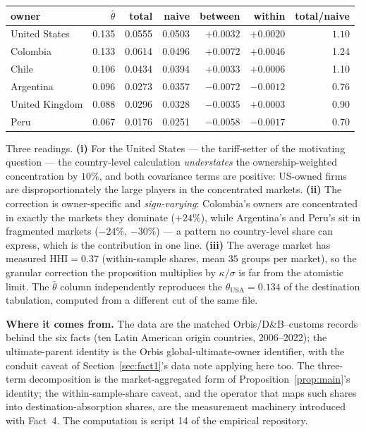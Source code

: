 \documentclass[11pt]{article}
\newcommand{\from}[1]{\smallskip\noindent\textbf{Where it comes from.} #1\smallskip}
\theoremstyle{plain}
\theoremstyle{remark}
\theoremstyle{definition}
\begin{document}
\begin{center}
\small
\begin{tabular}{lrrrrrr}
\toprule
owner & $\bar\theta$ & total & naive & between & within & total/naive\\
\midrule
United States & 0.135 & 0.0555 & 0.0503 & $+0.0032$ & $+0.0020$ & $\mathbf{1.10}$\\
Colombia      & 0.133 & 0.0614 & 0.0496 & $+0.0072$ & $+0.0046$ & 1.24\\
Chile         & 0.106 & 0.0434 & 0.0394 & $+0.0033$ & $+0.0006$ & 1.10\\
Argentina     & 0.096 & 0.0273 & 0.0357 & $-0.0072$ & $-0.0012$ & 0.76\\
United Kingdom& 0.088 & 0.0296 & 0.0328 & $-0.0035$ & $+0.0003$ & 0.90\\
Peru          & 0.067 & 0.0176 & 0.0251 & $-0.0058$ & $-0.0017$ & 0.70\\
\bottomrule
\end{tabular}
\end{center}

\noindent Three readings. \textbf{(i)} For the United States --- the tariff-setter of
the motivating question --- the country-level calculation \emph{understates} the
ownership-weighted concentration by $10\%$, and both covariance terms are positive:
US-owned firms are disproportionately the large players in the concentrated markets.
\textbf{(ii)} The correction is owner-specific and \emph{sign-varying}: Colombia's
owners are concentrated in exactly the markets they dominate ($+24\%$), while
Argentina's and Peru's sit in fragmented markets ($-24\%$, $-30\%$) --- a pattern no
country-level share can express, which is the contribution in one line.
\textbf{(iii)} The average market has measured $\mathrm{HHI}=0.37$ (within-sample
shares, mean $35$ groups per market), so the granular correction the proposition
multiplies by $\kappa/\sigma$ is far from the atomistic limit. The $\bar\theta$ column
independently reproduces the $\theta_{\mathrm{USA}}=0.134$ of the destination
tabulation, computed from a different cut of the same file.

\from{The data are the matched Orbis/D\&B--customs records behind the six facts (ten
Latin American origin countries, 2006--2022); the ultimate-parent identity is the
Orbis global-ultimate-owner identifier, with the conduit caveat of
Section~\ref{sec:fact1}'s data note applying here too. The three-term decomposition is
the market-aggregated form of Proposition~\ref{prop:main}'s identity; the
within-sample-share caveat, and the operator that maps such shares into
destination-absorption shares, are the measurement machinery introduced with Fact~4.
The computation is script 14 of the empirical repository.}
\end{document}
